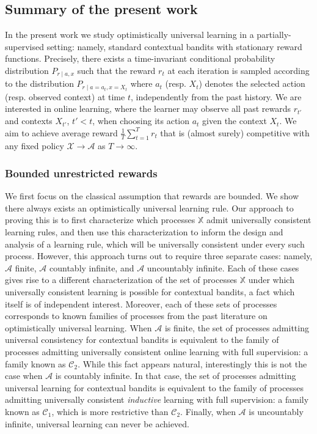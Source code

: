 \documentclass[aos]{imsart}
\theoremstyle{plain}
\theoremstyle{remark}
\newcommand{\Acal}{\mathcal{A}}
\newcommand{\Ccal}{\mathcal{C}}
\newcommand{\1}{\mathbbm{1}}%
\newcommand{\X}{\mathcal X}
\newcommand{\ProcX}{\mathbb{X}}
\begin{document}
\subsection{Summary of the present work}
In the present work we study optimistically universal learning in a partially-supervised setting: namely, standard contextual bandits \cite{slivkins2019introduction, lattimore2020bandit} with stationary reward functions. Precisely, there exists a time-invariant conditional probability distribution $P_{r\mid a,x}$ such that the reward $r_t$ at each iteration is sampled according to the distribution $P_{r\mid a=a_t,x=X_t}$ where $a_t$ (resp. $X_t$) denotes the selected action (resp. observed context) at time $t$, independently from the past history.
We are interested in online learning, where the learner may observe all past rewards $r_{t'}$ and contexts $X_{t'}$, $t' < t$,
when choosing its action $a_{t}$ given the context $X_t$.
We aim to achieve average reward $\frac{1}{T} \sum_{t=1}^{T} r_t$ that is (almost surely) competitive with any fixed policy $\X \to \Acal$ as $T\to\infty$.

\subsubsection{Bounded unrestricted rewards}
We first focus on the classical assumption that rewards are bounded. We show there always exists an optimistically universal learning rule.
Our approach to proving this is to first characterize which processes $\ProcX$ 
admit universally consistent learning rules, and then use this characterization to 
inform the design and analysis of a learning rule, which will be universally consistent under every such process.
However, this approach turns out to require three separate cases: 
namely, $\Acal$ finite, $\Acal$ countably infinite, and $\Acal$ uncountably infinite.
Each of these cases gives rise to a different characterization of the set of processes $\ProcX$ 
under which universally consistent learning is possible for contextual bandits, 
a fact which itself is of independent interest.
Moreover, each of these sets of processes corresponds to known families of processes 
from the past literature on optimistically universal learning.
When $\Acal$ is finite, the set of processes admitting universal consistency for contextual bandits is equivalent to the family of processes 
admitting universally consistent online learning with full supervision: a family known as $\Ccal_2$.
While this fact appears natural, interestingly this is not the case when $\Acal$ is countably infinite.
In that case, the set of processes admitting universal learning for contextual bandits is equivalent to the family of processes admitting 
universally consistent \emph{inductive} learning with full supervision: a family known as $\Ccal_1$, 
which is more restrictive than $\Ccal_2$.
Finally, when $\Acal$ is uncountably infinite,
universal learning can never be achieved.
\end{document}
